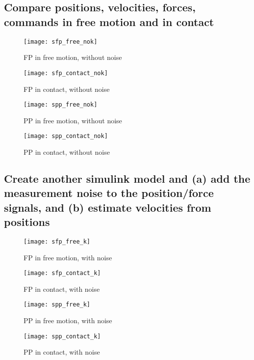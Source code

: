 \newpage

\subsection{Compare positions, velocities, forces, commands in free motion and in contact}

\begin{figure}[H]
\begin{minipage}{0.5\textwidth}
\centering
\texttt{[image: sfp\_free\_nok]}
\caption{FP in free motion, without noise}
\label{fig:sfp_free_nok}

\texttt{[image: sfp\_contact\_nok]}
\caption{FP in contact, without noise}
\label{fig:sfp_contact_nok}
\end{minipage}
\begin{minipage}{0.5\textwidth}
\centering
\texttt{[image: spp\_free\_nok]}
\caption{PP in free motion, without noise}
\label{fig:spp_free_nok}

\texttt{[image: spp\_contact\_nok]}
\caption{PP in contact, without noise}
\label{fig:spp_contact_nok}
\end{minipage}
\end{figure}

\newpage

\subsection{Create another simulink model and (a) add the measurement noise to the position/force signals, and (b) estimate velocities from positions}

\begin{figure}[H]
\begin{minipage}{0.5\textwidth}
\centering
\texttt{[image: sfp\_free\_k]}
\caption{FP in free motion, with noise}
\label{fig:sfp_free_k}

\texttt{[image: sfp\_contact\_k]}
\caption{FP in contact, with noise}
\label{fig:sfp_contact_k}
\end{minipage}
\begin{minipage}{0.5\textwidth}
\centering
\texttt{[image: spp\_free\_k]}
\caption{PP in free motion, with noise}
\label{fig:spp_free_k}

\texttt{[image: spp\_contact\_k]}
\caption{PP in contact, with noise}
\label{fig:spp_contact_k}
\end{minipage}
\end{figure}